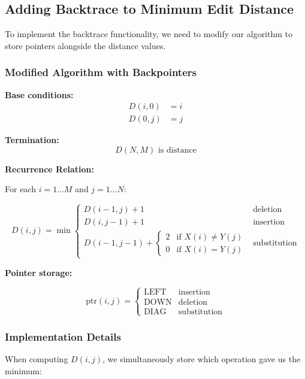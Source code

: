 \documentclass[11pt,a4paper]{article}
\theoremstyle{definition}
\theoremstyle{plain}
\theoremstyle{remark}
\begin{document}
\subsection{Adding Backtrace to Minimum Edit Distance}

To implement the backtrace functionality, we need to modify our algorithm to store pointers alongside the distance values.

\subsubsection{Modified Algorithm with Backpointers}

\textbf{Base conditions:}
\begin{align*}
D(i,0) &= i \\
D(0,j) &= j
\end{align*}

\textbf{Termination:}
\[
D(N,M) \text{ is distance}
\]

\textbf{Recurrence Relation:}

For each $i = 1 \ldots M$ and $j = 1 \ldots N$:

\[
D(i,j) = \min \begin{cases}
D(i-1,j) + 1 & \text{deletion} \\
D(i,j-1) + 1 & \text{insertion} \\
D(i-1,j-1) + \begin{cases}
2 & \text{if } X(i) \neq Y(j) \\
0 & \text{if } X(i) = Y(j)
\end{cases} & \text{substitution}
\end{cases}
\]

\textbf{Pointer storage:}

\[
\text{ptr}(i,j) = \begin{cases}
\text{LEFT} & \text{insertion} \\
\text{DOWN} & \text{deletion} \\
\text{DIAG} & \text{substitution}
\end{cases}
\]

\subsubsection{Implementation Details}

When computing $D(i,j)$, we simultaneously store which operation gave us the minimum:
\end{document}
